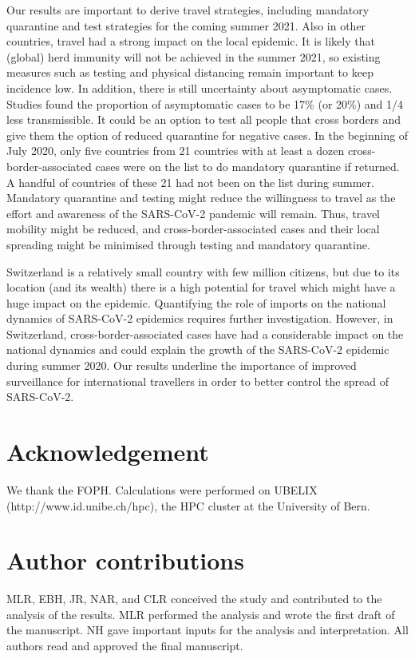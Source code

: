 \documentclass[10pt, a4paper, twoside]{article}
\begin{document}
\begin{multicols}{2}
Our results are important to derive travel strategies, including mandatory quarantine and test strategies for the coming summer 2021.
Also in other countries, travel had a strong impact on the local epidemic.\cite{russell_effect_2021,hodcroft_emergence_2020}
It is likely that (global) herd immunity will not be achieved in the summer 2021, so existing measures such as testing and physical distancing remain important to keep incidence low.
In addition, there is still uncertainty about asymptomatic cases.\cite{nogrady_what_2020}
Studies found the proportion of asymptomatic cases to be 17\% (or 20\%) and 1/4 less transmissible.\cite{byambasuren_estimating_2020,buitrago-garcia_occurrence_2020,bi_household_2020}
It could be an option to test all people that cross borders and give them the option of reduced quarantine for negative cases.\cite{ashcroft_quantifying_2021}
In the beginning of July 2020, only five countries from 21 countries with at least a dozen cross-border-associated cases were on the list to do mandatory quarantine if returned.
A handful of countries of these 21 had not been on the list during summer.
Mandatory quarantine and testing might reduce the willingness to travel as the effort and awareness of the SARS-CoV-2 pandemic will remain.
Thus, travel mobility might be reduced, and cross-border-associated cases and their local spreading might be minimised through testing and mandatory quarantine.



Switzerland is a relatively small country with few million citizens, but due to its location (and its wealth) there is a high potential for travel which might have a huge impact on the epidemic.
Quantifying the role of imports on the national dynamics of SARS-CoV-2 epidemics requires further investigation.
However, in Switzerland, cross-border-associated cases have had a considerable impact on the national dynamics and could explain the growth of the SARS-CoV-2 epidemic during summer 2020.
Our results underline the importance of improved surveillance for international travellers in order to better control the spread of SARS-CoV-2.


\section{Acknowledgement}
We thank the FOPH.  Calculations were performed on UBELIX (http://www.id.unibe.ch/hpc), the HPC cluster at the University of Bern.

\section{Author contributions}
MLR, EBH, JR, NAR, and CLR conceived the study and contributed to the analysis of the results.
MLR performed the analysis and wrote the first draft of the manuscript.
NH gave important inputs for the analysis and interpretation.
All authors read and approved the final manuscript.


\end{multicols}
\end{document}
